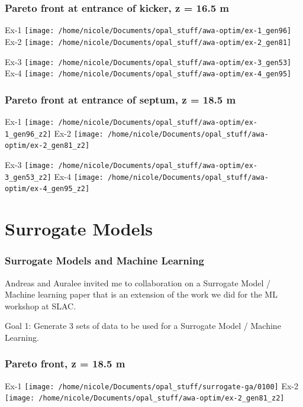 \documentclass[professionalfonts,t]{beamer}
\begin{document}
\begin{frame}[t]
\frametitle{Pareto front at entrance of kicker, z = 16.5 m}
		\begin{minipage}{0.48\textwidth}
			Ex-1
			\texttt{[image: /home/nicole/Documents/opal\_stuff/awa-optim/ex-1\_gen96]}
			Ex-2	\texttt{[image: /home/nicole/Documents/opal\_stuff/awa-optim/ex-2\_gen81]}
		\end{minipage}
		\begin{minipage}{0.48\textwidth}
			Ex-3
			\texttt{[image: /home/nicole/Documents/opal\_stuff/awa-optim/ex-3\_gen53]}
			Ex-4
			\texttt{[image: /home/nicole/Documents/opal\_stuff/awa-optim/ex-4\_gen95]}
		\end{minipage}

\end{frame}

\begin{frame}[t]
	\frametitle{Pareto front at entrance of septum, z = 18.5 m}
	\begin{minipage}{0.48\textwidth}
		Ex-1
		\texttt{[image: /home/nicole/Documents/opal\_stuff/awa-optim/ex-1\_gen96\_z2]}
		Ex-2
		\texttt{[image: /home/nicole/Documents/opal\_stuff/awa-optim/ex-2\_gen81\_z2]}
	\end{minipage}
	\begin{minipage}{0.48\textwidth}
		Ex-3
		\texttt{[image: /home/nicole/Documents/opal\_stuff/awa-optim/ex-3\_gen53\_z2]}
		Ex-4
		\texttt{[image: /home/nicole/Documents/opal\_stuff/awa-optim/ex-4\_gen95\_z2]}
	\end{minipage}	
\end{frame}

\section{Surrogate Models}
\begin{frame}
	\frametitle{Surrogate Models and Machine Learning}
	Andreas and Auralee invited me to collaboration on a Surrogate Model / Machine learning paper that is an extension of the work we did for the ML workshop at SLAC.
	\vspace{1em}	
	
	Goal 1: Generate 3 sets of data to be used for a Surrogate Model / Machine Learning.
\end{frame}


\begin{frame}[t]
	\frametitle{Pareto front, z = 18.5 m}
	\begin{minipage}{0.48\textwidth}
		Ex-1
		\texttt{[image: /home/nicole/Documents/opal\_stuff/surrogate-ga/0100]}
		Ex-2
		\texttt{[image: /home/nicole/Documents/opal\_stuff/awa-optim/ex-2\_gen81\_z2]}
	\end{minipage}
\end{frame}
\end{document}
